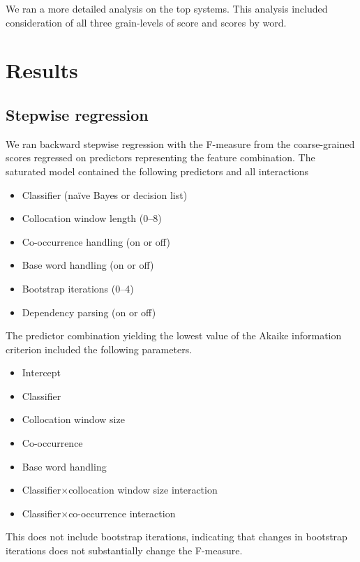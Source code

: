 \documentclass{article}
\newcommand{\naive}{na\"ive}
\begin{document}
We ran a more detailed analysis on the top \few systems.  This analysis included
consideration of all three grain-levels of score and scores by word.

\section{Results}

\subsection{Stepwise regression}

We ran backward stepwise regression with the F-measure from the coarse-grained
scores regressed on predictors representing the feature combination.  The
saturated model contained the following predictors and all interactions

\begin{itemize}
\item Classifier (\naive{} Bayes or decision list)
\item Collocation window length (0--8)
\item Co-occurrence handling (on or off)
\item Base word handling (on or off)
\item Bootstrap iterations (0--4)
\item Dependency parsing (on or off)
\end{itemize}

The predictor combination yielding the lowest value of the Akaike information criterion
included the following parameters.

\begin{itemize}
\item Intercept
\item Classifier
\item Collocation window size
\item Co-occurrence
\item Base word handling
\item Classifier$\times$collocation window size interaction
\item Classifier$\times$co-occurrence interaction
\end{itemize}

This does not include bootstrap iterations, indicating that changes
in bootstrap iterations does not substantially change the F-measure.

\end{document}
